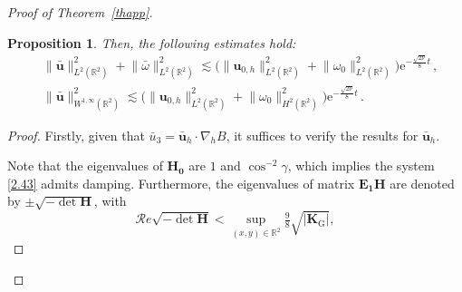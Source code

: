 \documentclass[pdflatex,sn-mathphys-num]{sn-jnl}%
\theoremstyle{thmstyleone}%
\newtheorem{proposition}[theorem]{Proposition}%
\theoremstyle{thmstyletwo}%
\theoremstyle{thmstylethree}%
\theoremstyle{thmstyletwo}
\begin{document}
\begin{proof}[Proof of Theorem~{\upshape\ref{thapp}}]
\begin{proposition}
	
	Then,  the following  estimates hold:
	\begin{align}
		&\lVert\bar {\boldsymbol u}\rVert_{L^2(\mathbb{R}^2)}^2
		+\lVert\bar{\omega}\rVert_{L^2(\mathbb{R}^2)}^2
		\lesssim
		\Big(\lVert{\boldsymbol{u}}_{0,h}\rVert_{L^2(\mathbb{R}^2)}^2+\lVert{\omega}_0\rVert_{L^2(\mathbb{R}^2)}^2\Big) \mathrm{e}^{-\frac{\sqrt{2\nu}}{8}  t}\,,\label{2.47}\\
		&\lVert\bar {\boldsymbol u}\rVert_{W^{1,\infty}(\mathbb{R}^2)}^2
		\lesssim
		\Big(\lVert{\boldsymbol{u}}_{0,h}\rVert_{L^2(\mathbb{R}^2)}^2+\lVert{\omega}_0\rVert_{H^2(\mathbb{R}^2)}^2\Big) \mathrm{e}^{-\frac{\sqrt{2\nu}}{8}  t}\label{2.48}\,.
	\end{align}
\end{proposition}	
\begin{proof}
		Firstly, given that $\bar{u}_3=\bar{\boldsymbol{u}}_h\cdot \nabla_hB$, it suffices to verify the results for $\bar{\boldsymbol{u}}_h$.
	
	
	Note that the eigenvalues of $\boldsymbol{H_0}$ are $1$ and $\cos^{-2}\gamma$, which implies the system \eqref{2.43} admits damping. 
	Furthermore, the eigenvalues of matrix $\boldsymbol{E_1}\boldsymbol{H}$ are denoted by $\pm\sqrt{-\det\boldsymbol{H}}$, with
	\begin{equation}\label{H}
		\mathcal{R}e\sqrt{-\det\boldsymbol{H}}<\sup\limits_{(x,y)\in \mathbb{R}^2}\tfrac98\sqrt{|\boldsymbol{K}_{\mathrm{G}}|},
	\end{equation}
	
	
	

\end{proof}
\end{proof}
\end{document}
